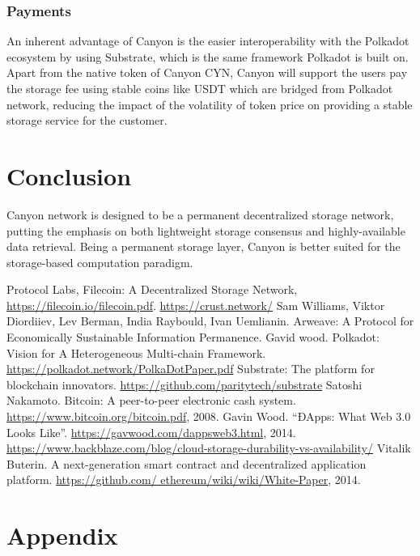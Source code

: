 \documentclass[]{article}
\begin{document}
\subsubsection{Payments}

An inherent advantage of Canyon is the easier interoperability with the Polkadot\cite{polkadot} ecosystem by using Substrate\cite{substrate}, which is the same framework Polkadot is built on. Apart from the native token of Canyon CYN, Canyon will support the users pay the storage fee using stable coins like USDT which are bridged from Polkadot network, reducing the impact of the volatility of token price on providing a stable storage service for the customer.

\section{Conclusion}

Canyon network is designed to be a permanent decentralized storage network, putting the emphasis on both lightweight storage consensus and highly-available data retrieval. Being a permanent storage layer, Canyon is better suited for the storage-based computation paradigm.

\begin{thebibliography}{99}
Protocol Labs, Filecoin: A Decentralized Storage Network, \url{https://filecoin.io/filecoin.pdf}.
\url{https://crust.network/}
Sam Williams, Viktor Diordiiev, Lev Berman, India Raybould, Ivan Uemlianin. Arweave: A Protocol for Economically Sustainable Information Permanence.
Gavid wood. Polkadot: Vision for A Heterogeneous Multi-chain Framework. \url{https://polkadot.network/PolkaDotPaper.pdf}
Substrate: The platform for blockchain innovators. \url{https://github.com/paritytech/substrate}
Satoshi Nakamoto. Bitcoin: A peer-to-peer electronic cash system. \url{https://www.bitcoin.org/bitcoin.pdf}, 2008.
Gavin Wood. “ĐApps: What Web 3.0 Looks Like”. \url{https://gavwood.com/dappsweb3.html}, 2014.
\url{https://www.backblaze.com/blog/cloud-storage-durability-vs-availability/}
Vitalik Buterin. A next-generation smart contract and decentralized application platform. \url{https://github.com/
ethereum/wiki/wiki/White-Paper}, 2014.
\end{thebibliography}

\appendix
\section{Appendix}
\end{document}
